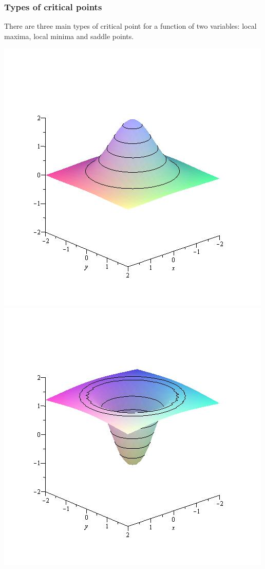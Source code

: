\documentclass[9pt]{beamer}
\begin{document}
\begin{frame}[t]
 \frametitle{Types of critical points}
 There are three main types of critical point for a function of two
 variables: local maxima, local minima and saddle points.
 \begin{center}
  \includegraphics[clip,trim=2cm 2cm 2cm 2cm,scale=0.25]{images/maxp.jpg}
  \includegraphics[clip,trim=2cm 2cm 2cm 2cm,scale=0.25]{images/minp.jpg}

\end{center}
\end{frame}
\end{document}
